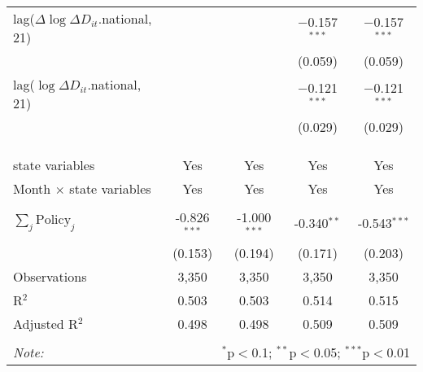 \begin{tabular}{@{\extracolsep{1pt}}lcccc}
  lag($\Delta \log \Delta D_{it}$.national, 21) &  &  & $-$0.157$^{***}$ & $-$0.157$^{***}$ \\ 
  &  &  & (0.059) & (0.059) \\ 
  lag($\log \Delta D_{it}$.national, 21) &  &  & $-$0.121$^{***}$ & $-$0.121$^{***}$ \\ 
  &  &  & (0.029) & (0.029) \\ 
   &  &  &  &  \\ 
  &  &  &  &  \\ 
 \hline \\[-1.8ex] 
state variables & Yes & Yes & Yes & Yes \\ 
Month $\times$ state variables & Yes & Yes & Yes & Yes \\ 
\hline \\[-1.8ex] 
$\sum_j \mathrm{Policy}_j$ & -0.826$^{***}$ & -1.000$^{***}$ & -0.340$^{**}$ & -0.543$^{***}$ \\ 
 & (0.153) & (0.194) & (0.171) & (0.203) \\ 
Observations & 3,350 & 3,350 & 3,350 & 3,350 \\ 
R$^{2}$ & 0.503 & 0.503 & 0.514 & 0.515 \\ 
Adjusted R$^{2}$ & 0.498 & 0.498 & 0.509 & 0.509 \\ 
\hline 
\hline \\[-1.8ex] 
\textit{Note:}  & \multicolumn{4}{r}{$^{*}$p$<$0.1; $^{**}$p$<$0.05; $^{***}$p$<$0.01} \\ 
\end{tabular} 